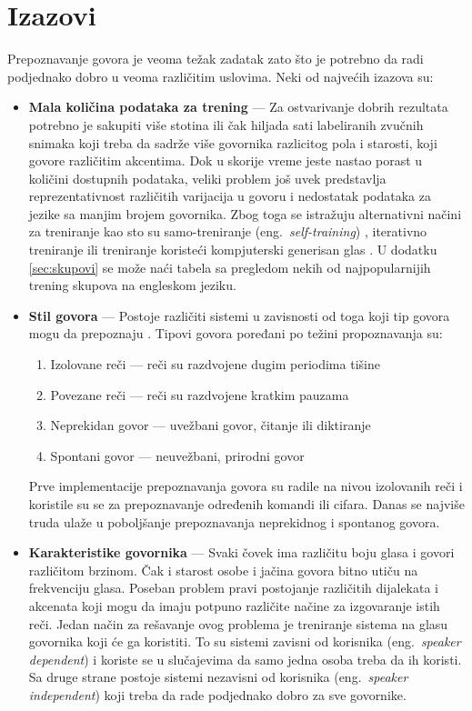 \documentclass[a4paper]{article}
\begin{document}
\section{Izazovi}
Prepoznavanje govora je veoma težak zadatak zato što je potrebno da radi podjednako dobro u veoma različitim uslovima.
Neki od najvećih izazova su:
\begin{itemize}
  \item \textbf{Mala količina podataka za trening} --- 
  Za ostvarivanje dobrih rezultata potrebno je sakupiti više stotina ili čak hiljada sati labeliranih zvučnih snimaka koji treba da sadrže više govornika razlicitog pola i starosti, koji govore različitim akcentima. 
  Dok u skorije vreme jeste nastao porast u količini dostupnih podataka, veliki problem još uvek predstavlja reprezentativnost različitih varijacija u govoru i nedostatak podataka za jezike sa manjim brojem govornika. 
  Zbog toga se istražuju alternativni načini za treniranje kao sto su samo-treniranje (eng.~{\em self-training}) \cite{baevski2020wav2vec}, iterativno treniranje \cite{park2020noisy} ili treniranje koristeći kompjuterski generisan glas \cite{hannun2014deep}. 
  U dodatku \ref{sec:skupovi} se može naći tabela sa pregledom nekih od najpopularnijih trening skupova na engleskom jeziku.
  
  \item \textbf{Stil govora} --- 
  Postoje različiti sistemi u zavisnosti od toga koji tip govora mogu da prepoznaju \cite{anusuya2010speech}. Tipovi govora poređani po težini propoznavanja su: 
  \begin{enumerate}
    \item Izolovane reči --- reči su razdvojene dugim periodima tišine
    \item Povezane reči --- reči su razdvojene kratkim pauzama
    \item Neprekidan govor --- uvežbani govor, čitanje ili diktiranje
    \item Spontani govor --- neuvežbani, prirodni govor 
  \end{enumerate}
  Prve implementacije prepoznavanja govora su radile na nivou izolovanih reči i koristile su se za prepoznavanje određenih komandi ili cifara.
  Danas se najviše truda ulaže u poboljšanje prepoznavanja neprekidnog i spontanog govora.

  \item \textbf{Karakteristike govornika} ---
  Svaki čovek ima različitu boju glasa i govori različitom brzinom. Čak i starost osobe i jačina govora bitno utiču na frekvenciju glasa.
  Poseban problem pravi postojanje različitih dijalekata i akcenata koji mogu da imaju potpuno različite načine za izgovaranje istih reči.
  Jedan način za rešavanje ovog problema je treniranje sistema na glasu govornika koji će ga koristiti.
  To su sistemi zavisni od korisnika (eng.~{\em speaker dependent}) i koriste se u slučajevima da samo jedna osoba treba da ih koristi.
  Sa druge strane postoje sistemi nezavisni od korisnika (eng.~{\em speaker independent}) koji treba da rade podjednako dobro za sve govornike.
  

\end{itemize}
\end{document}
